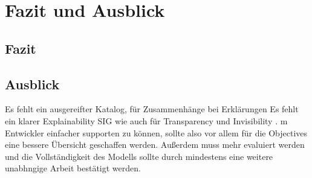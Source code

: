 \chapter{Fazit und Ausblick}

\section{Fazit}

\section{Ausblick}

Es fehlt ein ausgereifter Katalog, für Zusammenhänge bei Erklärungen
Es fehlt ein klarer Explainability SIG wie auch für Transparency \cite{do2010software} und Invisibility \cite{carvalho2020developers}. m Entwickler einfacher supporten zu können, sollte also vor allem für die Objectives eine bessere Übersicht geschaffen werden.
Außerdem muss mehr evaluiert werden und die Vollständigkeit des Modells sollte durch mindestens eine weitere unabhngige Arbeit bestätigt werden.